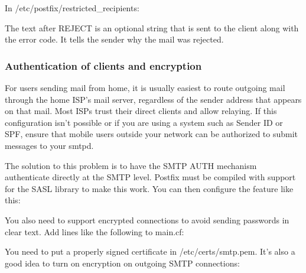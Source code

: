
In
\protect\hypertarget{part0026_split_063.htmlux5cux23_idIndexMarker2733}{}{}{/etc/postfix/restricted\_recipients}:


The text after {REJECT} is an optional string that is sent to the client
along with the error code. It tells the sender why the mail was
rejected.

\subsubsection[Authentication of clients and
encryption]{\texorpdfstring{\protect\hypertarget{part0026_split_063.htmlux5cux23_idTextAnchor1193}{}{}Authentication
of clients and encryption}{Authentication of clients and encryption}}

\protect\hypertarget{part0026_split_063.htmlux5cux23_idIndexMarker2734}{}{}For
users sending mail from home, it is usually easiest to route outgoing
mail through the home ISP's mail server, regardless of the sender
address that appears on that mail. Most ISPs trust their direct clients
and allow relaying. If this configuration isn't possible or if you are
using a system such as Sender ID or SPF, ensure that mobile users
outside your network can be authorized to submit messages to your
{smtpd}.

The solution to this problem is to have the SMTP AUTH mechanism
authenticate directly at the SMTP level. Postfix must be compiled with
support for the SASL library to make this work. You can then configure
the feature like
this:\protect\hypertarget{part0026_split_063.htmlux5cux23_idIndexMarker2735}{}{}\protect\hypertarget{part0026_split_063.htmlux5cux23_idIndexMarker2736}{}{}


You also need to support encrypted connections to avoid sending
passwords in clear text. {Add lines like the following to
}{main.cf}{:}\protect\hypertarget{part0026_split_063.htmlux5cux23_idIndexMarker2737}{}{}


You need to put a properly signed certificate in {/etc/certs/smtp.pem}.
It's also a good idea to turn on encryption on outgoing SMTP
connections:


\protect\hypertarget{part0026_split_064.html}{}{}

